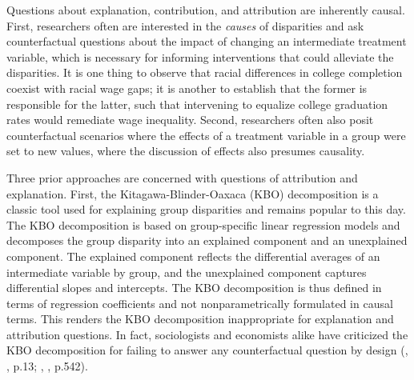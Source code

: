\documentclass[12pt,a4paper]{article}
\begin{document}
Questions about explanation, contribution, and attribution
are inherently causal. First, researchers often are interested in the \emph{causes} of disparities and ask counterfactual questions about the impact of changing an intermediate treatment variable, which is necessary for informing interventions that could alleviate the disparities. It is one thing to observe that racial differences in college completion coexist with racial wage gaps; it is another to establish that the former is responsible for the latter, such that intervening to equalize college graduation rates would remediate wage inequality. Second, researchers often also posit counterfactual scenarios where the effects of a treatment variable in a group were set to new values, where the discussion of effects also presumes causality. 

Three prior approaches are concerned with questions of attribution and explanation.  
First, the Kitagawa-Blinder-Oaxaca (KBO) decomposition \citep{kitagawa_components_1955, blinder_wage_1973, oaxaca_male-female_1973} is a classic tool used for explaining group disparities and remains popular to this day. 
The KBO decomposition is based on group-specific linear regression models and decomposes the group disparity into an explained component and an unexplained component. The explained component reflects the differential averages of an intermediate variable by group, and the unexplained component captures differential slopes and intercepts. The KBO decomposition is thus defined in terms of regression coefficients and not nonparametrically formulated in causal terms. This renders the KBO decomposition inappropriate for explanation and attribution questions. In fact, sociologists and economists alike have criticized the KBO decomposition for failing to answer any  counterfactual question by design (\citeauthor{fortin_decomposition_2011}, \citeyear{fortin_decomposition_2011}, p.13; \citeauthor{lundberg_what_2021}, \citeyear{lundberg_what_2021}, p.542). 
\end{document}
